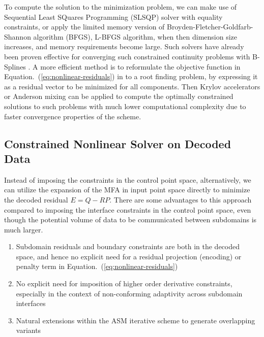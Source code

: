 \documentclass[conference]{IEEEtran}
\newcommand{\eqt}[1]{Equation.~(\ref{#1})}
\begin{document}
To compute the 	solution to the minimization problem, we can make use of Sequential Least SQuares Programming (SLSQP) solver with equality constraints, or apply the limited memory version of  Broyden-Fletcher-Goldfarb-Shannon algorithm (BFGS), L-BFGS algorithm, when then dimension size increases, and memory requirements become large. Such solvers have already been proven effective for converging such constrained continuity problems with B-Splines \cite{zheng-bo-bspline-bfgs}. A more efficient method is to reformulate the objective function in \eqt{eq:nonlinear-residuals} in to a root finding problem, by expressing it as a residual vector to be minimized for all components. Then Krylov accelerators or Anderson mixing can be applied to compute the optimally constrained solutions to such problems with much lower computational complexity due to faster convergence properties of the scheme.


\subsection{Constrained Nonlinear Solver on Decoded Data}

Instead of imposing the constraints in the control point space, alternatively, we can utilize the expansion of the MFA in input point space directly to minimize the decoded residual $E= Q - R P$. There are some advantages to this approach compared to imposing the interface constraints in the control point space, even though the potential volume of data to be communicated between subdomains is much larger.

\begin{enumerate}
	\item Subdomain residuals and boundary constraints are both in the decoded space, and hence no explicit need for a residual projection (encoding) or penalty term in \eqt{eq:nonlinear-residuals}
	\item No explicit need for imposition of higher order derivative constraints, especially in the context of non-conforming adaptivity across subdomain interfaces
	\item Natural extensions within the ASM iterative scheme to generate overlapping variants
\end{enumerate}
\end{document}
